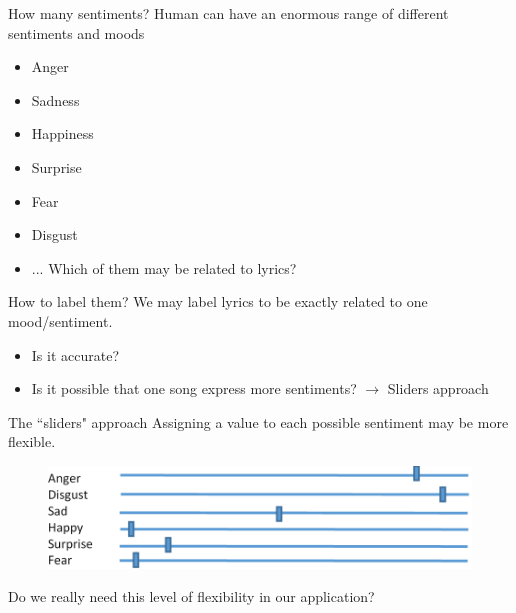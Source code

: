 \documentclass[xcolor=dvipsnames]{beamer}
\begin{document}
\begin{frame}{How many sentiments?}
Human can have an enormous range of different sentiments and moods
\begin{itemize}
\item Anger
\item Sadness
\item Happiness
\item Surprise
\item Fear
\item Disgust
\item ...
Which of them may be related to lyrics?
\end{itemize}
\end{frame}

\begin{frame}{How to label them?}
We may label lyrics to be exactly related to one mood/sentiment.
\begin{itemize}
\item Is it accurate?
\item Is it possible that one song express more sentiments? $\rightarrow$ Sliders approach
\end{itemize}
\end{frame}

\begin{frame}{The ``sliders" approach}
Assigning a value to each possible sentiment may be more flexible.
\begin{figure}
	\centering
	\includegraphics[scale=0.35]{./images/emotion_labeling_sliders}
\end{figure}
Do we really need this level of flexibility in our application?
\end{frame}
\end{document}
